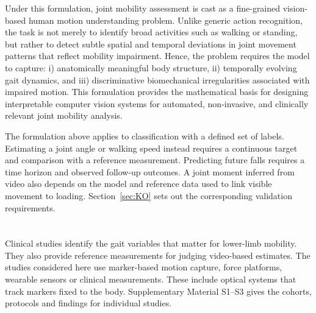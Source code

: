 \documentclass[12pt,nopreprintline]{elsarticle}
\begin{document}
Under this formulation, joint mobility assessment is cast as a fine-grained vision-based human motion understanding problem. Unlike generic action recognition, the task is not merely to identify broad activities such as walking or standing, but rather to detect subtle spatial and temporal deviations in joint movement patterns that reflect mobility impairment. Hence, the problem requires the model to capture: i) anatomically meaningful body structure, ii) temporally evolving gait dynamics, and iii) discriminative biomechanical irregularities associated with impaired motion. This formulation provides the mathematical basis for designing interpretable computer vision systems for automated, non-invasive, and clinically relevant joint mobility analysis.

\begin{revision}
The formulation above applies to classification with a defined set of labels. Estimating a joint angle or walking speed instead requires a continuous target and comparison with a reference measurement. Predicting future falls requires a time horizon and observed follow-up outcomes. A joint moment inferred from video also depends on the model and reference data used to link visible movement to loading. Section~\ref{sec:KO} sets out the corresponding validation requirements.
\end{revision}


\section{}
\label{sec:JMPWTCV}
\begin{revision}
Clinical studies identify the gait variables that matter for lower-limb mobility. They also provide reference measurements for judging video-based estimates. The studies considered here use marker-based motion capture, force platforms, wearable sensors or clinical measurements. These include optical systems that track markers fixed to the body. Supplementary Material S1--S3 gives the cohorts, protocols and findings for individual studies.
\end{revision}
\end{document}
